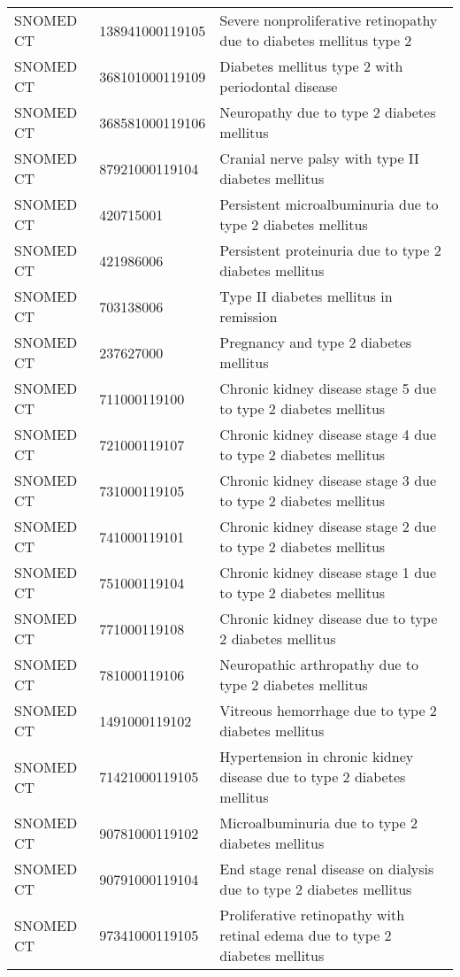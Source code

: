 \begin{longtable}{p{}p{}p{}}
  SNOMED CT & 138941000119105 & Severe nonproliferative retinopathy due to diabetes mellitus type 2 \\ 
  SNOMED CT & 368101000119109 & Diabetes mellitus type 2 with periodontal disease \\ 
  SNOMED CT & 368581000119106 & Neuropathy due to type 2 diabetes mellitus \\ 
  SNOMED CT & 87921000119104 & Cranial nerve palsy with type II diabetes mellitus \\ 
  SNOMED CT & 420715001 & Persistent microalbuminuria due to type 2 diabetes mellitus \\ 
  SNOMED CT & 421986006 & Persistent proteinuria due to type 2 diabetes mellitus \\ 
  SNOMED CT & 703138006 & Type II diabetes mellitus in remission \\ 
  SNOMED CT & 237627000 & Pregnancy and type 2 diabetes mellitus \\ 
  SNOMED CT & 711000119100 & Chronic kidney disease stage 5 due to type 2 diabetes mellitus \\ 
  SNOMED CT & 721000119107 & Chronic kidney disease stage 4 due to type 2 diabetes mellitus \\ 
  SNOMED CT & 731000119105 & Chronic kidney disease stage 3 due to type 2 diabetes mellitus \\ 
  SNOMED CT & 741000119101 & Chronic kidney disease stage 2 due to type 2 diabetes mellitus \\ 
  SNOMED CT & 751000119104 & Chronic kidney disease stage 1 due to type 2 diabetes mellitus \\ 
  SNOMED CT & 771000119108 & Chronic kidney disease due to type 2 diabetes mellitus \\ 
  SNOMED CT & 781000119106 & Neuropathic arthropathy due to type 2 diabetes mellitus \\ 
  SNOMED CT & 1491000119102 & Vitreous hemorrhage due to type 2 diabetes mellitus \\ 
  SNOMED CT & 71421000119105 & Hypertension in chronic kidney disease due to type 2 diabetes mellitus \\ 
  SNOMED CT & 90781000119102 & Microalbuminuria due to type 2 diabetes mellitus \\ 
  SNOMED CT & 90791000119104 & End stage renal disease on dialysis due to type 2 diabetes mellitus \\ 
  SNOMED CT & 97341000119105 & Proliferative retinopathy with retinal edema due to type 2 diabetes mellitus \\ 

\end{longtable}
